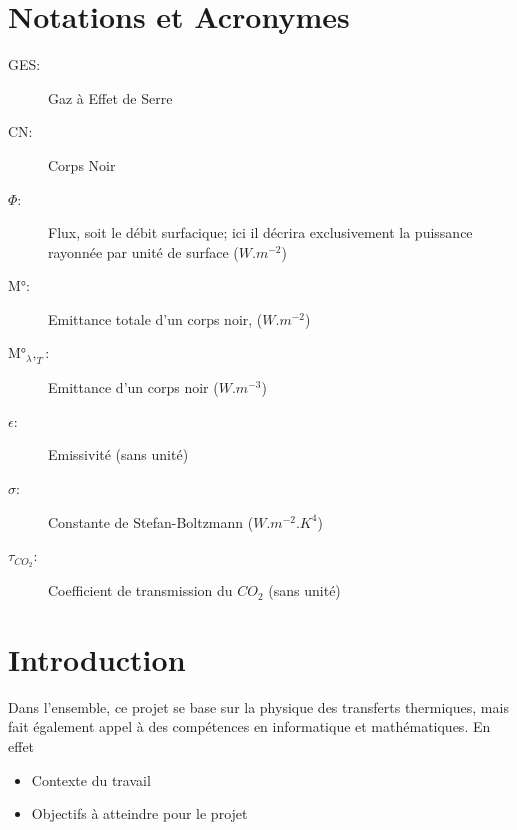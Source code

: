 \documentclass[a4paper, 12pt]{report} %
\begin{document}
\vfill


\newpage
\pagestyle{courant} 
	\setcounter{tocdepth}{2} %
	\tableofcontents %


\newpage
\chapter*{Notations et Acronymes} 

\begin{description}
	\item[GES:] Gaz à Effet de Serre
    \item[CN:] Corps Noir
    
    \item[$\Phi$:] Flux, soit le débit surfacique; ici il décrira exclusivement 
	la puissance rayonnée par unité de surface ($W.m^{-2}$)
    \item[M°:] Emittance totale d'un corps noir, ($W.m^{-2}$)
    \item[M°$_\lambda,_T$:] Emittance d'un corps noir ($W.m^{-3}$)
    \item[$\epsilon$:] Emissivité (sans unité)
    \item[$\sigma$:] Constante de Stefan-Boltzmann ($W.m^{-2}.K^{4}$)
    \item[$\tau_{CO_2}$:] Coefficient de transmission du $CO_2$ (sans unité)
\end{description}


\newpage
\chapter*{Introduction}				

Dans l'ensemble, ce projet se base sur la physique des transferts thermiques, 
mais fait également appel à des compétences en informatique et mathématiques.
En effet 
\begin{itemize}
\item Contexte du travail
	  
\item Objectifs à atteindre pour le projet
\end{itemize}

\end{document}
